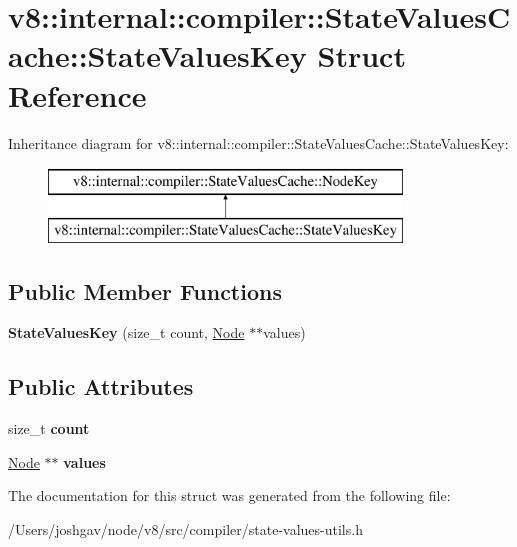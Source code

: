 \hypertarget{structv8_1_1internal_1_1compiler_1_1_state_values_cache_1_1_state_values_key}{}\section{v8\+:\+:internal\+:\+:compiler\+:\+:State\+Values\+Cache\+:\+:State\+Values\+Key Struct Reference}
\label{structv8_1_1internal_1_1compiler_1_1_state_values_cache_1_1_state_values_key}
Inheritance diagram for v8\+:\+:internal\+:\+:compiler\+:\+:State\+Values\+Cache\+:\+:State\+Values\+Key\+:\begin{figure}[H]
\begin{center}
\leavevmode
\includegraphics[height=2.000000cm]{structv8_1_1internal_1_1compiler_1_1_state_values_cache_1_1_state_values_key}
\end{center}
\end{figure}
\subsection*{Public Member Functions}
\begin{DoxyCompactItemize}
\item 
{\bfseries State\+Values\+Key} (size\+\_\+t count, \hyperlink{classv8_1_1internal_1_1compiler_1_1_node}{Node} $\ast$$\ast$values)\hypertarget{structv8_1_1internal_1_1compiler_1_1_state_values_cache_1_1_state_values_key_a8a7ede5e3683c80dd1b06c2d62ea2f8e}{}\label{structv8_1_1internal_1_1compiler_1_1_state_values_cache_1_1_state_values_key_a8a7ede5e3683c80dd1b06c2d62ea2f8e}

\end{DoxyCompactItemize}
\subsection*{Public Attributes}
\begin{DoxyCompactItemize}
\item 
size\+\_\+t {\bfseries count}\hypertarget{structv8_1_1internal_1_1compiler_1_1_state_values_cache_1_1_state_values_key_ac31daca2ae19517d441fcda1af4c35c7}{}\label{structv8_1_1internal_1_1compiler_1_1_state_values_cache_1_1_state_values_key_ac31daca2ae19517d441fcda1af4c35c7}

\item 
\hyperlink{classv8_1_1internal_1_1compiler_1_1_node}{Node} $\ast$$\ast$ {\bfseries values}\hypertarget{structv8_1_1internal_1_1compiler_1_1_state_values_cache_1_1_state_values_key_a491ccfc3087ffe1f90442932aa52bea4}{}\label{structv8_1_1internal_1_1compiler_1_1_state_values_cache_1_1_state_values_key_a491ccfc3087ffe1f90442932aa52bea4}

\end{DoxyCompactItemize}


The documentation for this struct was generated from the following file\+:\begin{DoxyCompactItemize}
\item 
/\+Users/joshgav/node/v8/src/compiler/state-\/values-\/utils.\+h\end{DoxyCompactItemize}
